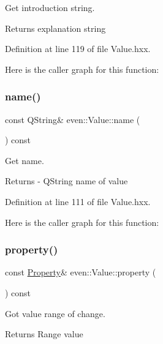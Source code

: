Get introduction string. 

\begin{DoxyReturn}{Returns}
explanation string 
\end{DoxyReturn}


Definition at line 119 of file Value.\+hxx.

Here is the caller graph for this function\+:
\mbox{\label{classeven_1_1_value_a0b679578058ff80fb58d8eb5683998c6}} 
\subsubsection{\texorpdfstring{name()}{name()}}
{\footnotesize\ttfamily const Q\+String\& even\+::\+Value\+::name (\begin{DoxyParamCaption}{ }\end{DoxyParamCaption}) const\hspace{0.3cm}{\ttfamily [inline]}}



Get name. 

\begin{DoxyReturn}{Returns}
-\/ Q\+String name of value 
\end{DoxyReturn}


Definition at line 111 of file Value.\+hxx.

Here is the caller graph for this function\+:
\mbox{\label{classeven_1_1_value_a2306024bbf8484a692575d56feb902e7}} 
\subsubsection{\texorpdfstring{property()}{property()}}
{\footnotesize\ttfamily const \mbox{\hyperlink{structeven_1_1_value_1_1_property}{Property}}\& even\+::\+Value\+::property (\begin{DoxyParamCaption}{ }\end{DoxyParamCaption}) const\hspace{0.3cm}{\ttfamily [inline]}}



Got value range of change. 

\begin{DoxyReturn}{Returns}
Range value 
\end{DoxyReturn}


